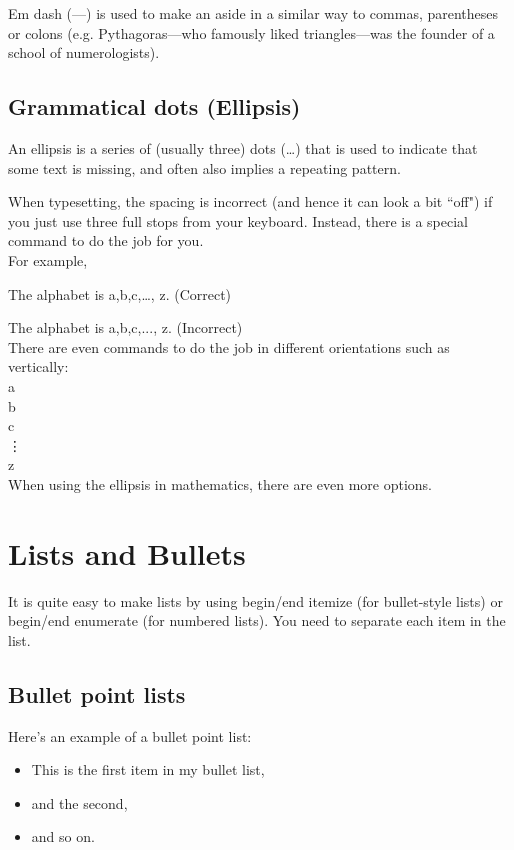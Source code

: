 \documentclass[a4paper,11pt]{article}
\begin{document}
Em dash (---) is used to make an aside in a similar way to commas, parentheses or colons  (e.g. Pythagoras---who famously liked triangles---was the founder of a school of numerologists).






\subsection{Grammatical dots (Ellipsis)}

An ellipsis is a series of (usually three) dots (\dots) that is used to indicate that some text is missing, and often also implies a repeating pattern.

When typesetting, the spacing is incorrect (and hence it can look a bit ``off") if you just use three full stops from your keyboard. Instead, there is a special command to do the job for you.\\
For example,

The alphabet is a,b,c,\dots, z. (Correct)

The alphabet is a,b,c,..., z. (Incorrect)\\

There are even commands to do the job in different orientations such as vertically:\\
a\\
b\\
c\\
\vdots\\
z\\

When using the ellipsis in mathematics, there are even more options.

\pagebreak



\section{Lists and Bullets}

It is quite easy to make lists  by using begin/end itemize (for bullet-style lists) or begin/end enumerate (for numbered lists). You need to separate each item in the list.

\subsection{Bullet point lists}

Here's an example of a bullet point list:

\begin{itemize}
\item This is the first item in my bullet list,
\item and the second,
\item and so on.
\end{itemize}
\end{document}
